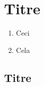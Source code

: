 \documentclass[a4paper,12pt,french]{book}
\begin{document}
\chapter{Titre}

\begin{aretenir}
\begin{enumerate}[\textbullet]
	\item 	Ceci
	\item 	Cela
\end{enumerate}
\end{aretenir}

\section{Titre}
\end{document}
